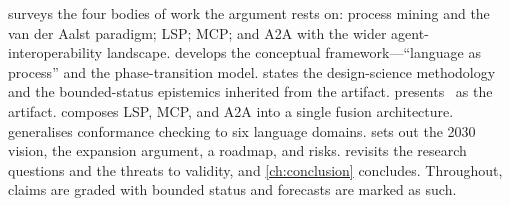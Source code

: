  surveys the four bodies of work the argument rests on:
process mining and the van der Aalst paradigm; LSP; MCP; and A2A with the wider
agent-interoperability landscape.  develops the conceptual
framework---``language as process'' and the phase-transition model.
 states the design-science methodology and the
bounded-status epistemics inherited from the artifact. 
presents \lspmax\ as the artifact.  composes LSP, MCP, and A2A
into a single fusion architecture.  generalises conformance
checking to six language domains.  sets out the 2030 vision, the
expansion argument, a roadmap, and risks.  revisits the
research questions and the threats to validity, and \cref{ch:conclusion}
concludes. Throughout, claims are graded with bounded status and forecasts are
marked as such.
